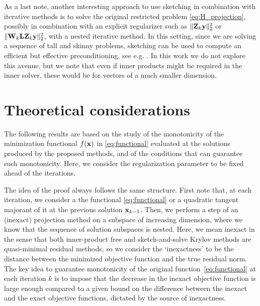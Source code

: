 \documentclass[11pt]{article}
\numberwithin{equation}{section}
\newcommand{\bfL}{{\bf L}}
\newcommand{\bfW}{{\bf W}}
\newcommand{\bfZ}{{\bf Z}}
\newcommand{\bfx}{{\bf x}}
\newcommand{\bfy}{{\bf y}}
\begin{document}
As a last note, another interesting approach to use sketching in combination with iterative methods is to solve the original restricted problem \eqref{eq:H_projection}, possibly in combination with an explicit regularizer such as $\|\bfZ_k\bfy\|_2^2$ or $\|\bfW_k \bfL \bfZ_k\bfy\|_2^2$, with a nested iterative method. In this setting, since we are solving a sequence of tall and skinny problems, sketching can be used to compute an efficient but effective preconditioning, see e.g. \cite{Sabate2025rand}. In this work we do not explore this avenue, but we note that even if  inner products might be required in the inner solver, these would be for vectors of a much smaller dimension.

\section{Theoretical considerations}\label{sec4}
The following results are based on the study of the monotonicity of the minimization functional $f(\bfx)$ in \eqref{eq:functional} evaluated at the solutions produced by the proposed methods, and of the conditions that can guarantee such monotonicity. Here, we consider the regularization parameter to be fixed ahead of the iterations.

The idea of the proof always follows the same structure. First note that, at each iteration,  we consider a the functional \eqref{eq:functional} or a quadratic tangent majorant of it at the previous solution $\bfx_{k-1}$. Then, we perform a step of an (inexact) projection method on a subspace of increasing dimension, where we know that the sequence of solution subspaces is nested. Here, we mean inexact in the sense that both inner-product free and sketch-and-solve Krylov methods are quasi-minimal residual methods, so we consider the `inexactness' to be the distance between the minimized objective function and the true residual norm. The key idea to guarantee monotonicity of the original function~\eqref{eq:functional} at each iteration $k$ is to impose that the decrease in the inexact objective function is large enough compared to a given bound on the difference between the inexact and the exact objective functions, dictated by the source of inexactness.
\end{document}
